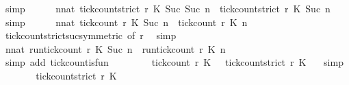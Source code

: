 \begin{isabellebody}
\ simp\isanewline
\ \ \ \ \isamarkupfalse%
\ {\isacartoucheopen}{\isasymforall}n{\isacharcolon}{\isacharcolon}nat{\isachardot}\ {\isacharparenleft}tick{\isacharunderscore}count{\isacharunderscore}strict\ r\ K\ {\isacharparenleft}Suc\ {\isacharparenleft}Suc\ n{\isacharparenright}{\isacharparenright}{\isacharparenright}\ {\isasymle}\ {\isacharparenleft}tick{\isacharunderscore}count{\isacharunderscore}strict\ r\ K\ {\isacharparenleft}Suc\ n{\isacharparenright}{\isacharparenright}{\isacartoucheclose}\ \isamarkupfalse%
\ simp\isanewline
\ \ \ \ \isamarkupfalse%
\ {\isacartoucheopen}{\isasymforall}n{\isacharcolon}{\isacharcolon}nat{\isachardot}\ {\isacharparenleft}tick{\isacharunderscore}count\ r\ K\ {\isacharparenleft}Suc\ n{\isacharparenright}{\isacharparenright}\ {\isasymle}\ {\isacharparenleft}tick{\isacharunderscore}count\ r\ K\ n{\isacharparenright}{\isacartoucheclose}\isanewline
\ \ \ \ \ \ \isamarkupfalse%
\ tick{\isacharunderscore}count{\isacharunderscore}strict{\isacharunderscore}suc{\isacharbrackleft}symmetric{\isacharcomma}\ of\ {\isacartoucheopen}r{\isacartoucheclose}{\isacharbrackright}\ \isamarkupfalse%
\ simp\isanewline
\ \ \ \ \isamarkupfalse%
\ {\isacharasterisk}{\isacharcolon}{\isacartoucheopen}{\isasymforall}n{\isacharcolon}{\isacharcolon}nat{\isachardot}\ {\isacharparenleft}run{\isacharunderscore}tick{\isacharunderscore}count\ r\ K\ {\isacharparenleft}Suc\ n{\isacharparenright}{\isacharparenright}\ {\isasymle}\ {\isacharparenleft}run{\isacharunderscore}tick{\isacharunderscore}count\ r\ K\ n{\isacharparenright}{\isacartoucheclose}\isanewline
\ \ \ \ \ \ \isamarkupfalse%
\ {\isacharparenleft}simp\ add{\isacharcolon}\ tick{\isacharunderscore}count{\isacharunderscore}is{\isacharunderscore}fun{\isacharparenright}\isanewline
\ \ \ \ \isamarkupfalse%
\ {}\ \isamarkupfalse%
\ {\isacartoucheopen}tick{\isacharunderscore}count\ r\ K\ {}\ {\isacharless}{\isacharequal}\ tick{\isacharunderscore}count{\isacharunderscore}strict\ r\ K\ {}{\isacartoucheclose}\ \isamarkupfalse%
\ simp\isanewline
\ \ \ \ \isamarkupfalse%
\ \isamarkupfalse%
\ {\isacartoucheopen}tick{\isacharunderscore}count{\isacharunderscore}strict\ r\ K\ {}\ {\isacharequal}\ {}{\isacartoucheclose}\ \isamarkupfalse%

\end{isabellebody}
